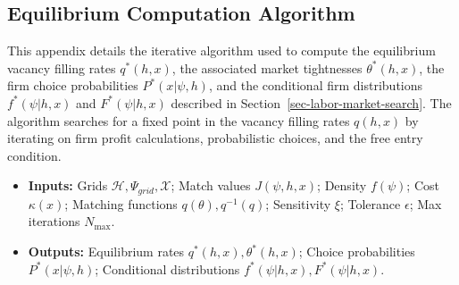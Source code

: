 \documentclass[
  11pt,
  letterpaper,
  DIV=11,
  numbers=noendperiod]{scrartcl}
\providecommand{\tightlist}{%
  \setlength{\itemsep}{0pt}\setlength{\parskip}{0pt}}\usepackage{longtable,booktabs,array}
\theoremstyle{plain}
\theoremstyle{remark}
\begin{document}
\subsection{Equilibrium Computation
Algorithm}\label{sec-appendix-endogenousFirmDistribution}

This appendix details the iterative algorithm used to compute the
equilibrium vacancy filling rates \(q^*(h, x)\), the associated market
tightnesses \(\theta^*(h, x)\), the firm choice probabilities
\(P^*(x | \psi, h)\), and the conditional firm distributions
\(f^*(\psi | h, x)\) and \(F^*(\psi | h, x)\) described in
Section~\ref{sec-labor-market-search}. The algorithm searches for a
fixed point in the vacancy filling rates \(q(h, x)\) by iterating on
firm profit calculations, probabilistic choices, and the free entry
condition.

\begin{itemize}
\tightlist
\item
  \textbf{Inputs:} Grids \(\mathcal{H}, \Psi_{grid}, \mathcal{X}\);
  Match values \(J(\psi, h, x)\); Density \(f(\psi)\); Cost
  \(\kappa(x)\); Matching functions \(q(\theta), q^{-1}(q)\);
  Sensitivity \(\xi\); Tolerance \(\epsilon\); Max iterations
  \(N_{\max}\).
\item
  \textbf{Outputs:} Equilibrium rates \(q^*(h, x), \theta^*(h, x)\);
  Choice probabilities \(P^*(x | \psi, h)\); Conditional distributions
  \(f^*(\psi | h, x), F^*(\psi | h, x)\).
\end{itemize}
\end{document}
